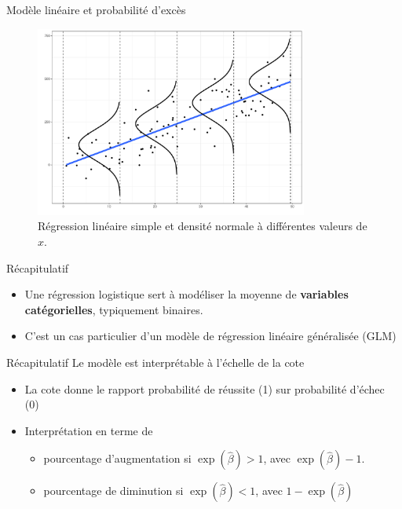 \documentclass[
  ignorenonframetext,
]{beamer}
\providecommand{\tightlist}{%
  \setlength{\itemsep}{0pt}\setlength{\parskip}{0pt}}\usepackage{longtable,booktabs,array}
\begin{document}
\begin{frame}{Modèle linéaire et probabilité d'excès}
\protect\hypertarget{moduxe8le-linuxe9aire-et-probabilituxe9-dexcuxe8s}{}
\begin{figure}

{\centering \includegraphics[width=0.8\textwidth,height=\textheight]{MATH60602-diapos5_files/figure-beamer/fig-density-normalcurves-1.pdf}

}

\caption{\label{fig-density-normalcurves}Régression linéaire simple et
densité normale à différentes valeurs de \(x\).}

\end{figure}
\end{frame}

\begin{frame}{Récapitulatif}
\protect\hypertarget{ruxe9capitulatif}{}
\begin{itemize}
\tightlist
\item
  Une régression logistique sert à modéliser la moyenne de
  \textbf{variables catégorielles}, typiquement binaires.
\item
  C'est un cas particulier d'un modèle de régression linéaire
  généralisée (GLM)
\end{itemize}
\end{frame}

\begin{frame}{Récapitulatif}
\protect\hypertarget{ruxe9capitulatif-1}{}
Le modèle est interprétable à l'échelle de la cote

\begin{itemize}
\tightlist
\item
  La cote donne le rapport probabilité de réussite (1) sur probabilité
  d'échec (0)
\item
  Interprétation en terme de

  \begin{itemize}
  \tightlist
  \item
    pourcentage d'augmentation si \(\exp(\widehat{\beta}) > 1\), avec
    \(\exp(\widehat{\beta})-1\).
  \item
    pourcentage de diminution si \(\exp(\widehat{\beta}) < 1\), avec
    \(1-\exp(\widehat{\beta})\)
  \end{itemize}
\end{itemize}
\end{frame}
\end{document}
